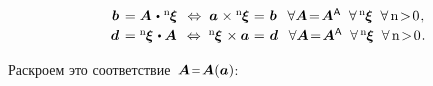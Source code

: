 \nopagebreak\vspace{-0.1em}\begin{equation}\begin{array}{c}
\hspace{1.2em} \bm{b} \hspace{.3ex}
= \bm{A} \hspace{.2ex}\dotp\hspace{.1ex} {^\mathrm{n}\hspace{-0.12ex}\bm{\xi}}
\;\,\Leftrightarrow\;
\bm{a} \hspace{.1ex} \times {^\mathrm{n}\hspace{-0.12ex}\bm{\xi}}
\hspace{.1ex} = \hspace{.15ex} \bm{b} \hspace{.1ex} \;\:\:
\forall \bm{A} \!=\! \bm{A}^{\mathsf{\!\,A}} \;\;
\forall \, {^\mathrm{n}\hspace{-0.12ex}\bm{\xi}} \;\; \forall \,\mathrm{n \!>\! 0}
\hspace{.15ex} ,
\\[.2em]
%
\hspace{1.2em} \bm{d} \hspace{.3ex}
= {^\mathrm{n}\hspace{-0.12ex}\bm{\xi}} \hspace{.2ex} \dotp \bm{A}
\;\,\Leftrightarrow\;
{^\mathrm{n}\hspace{-0.12ex}\bm{\xi}} \hspace{.2ex}\times \bm{a}
\hspace{.1ex} = \hspace{.15ex} \bm{d} \hspace{.1ex} \;\:\:
\forall \bm{A} \!=\! \bm{A}^{\mathsf{\!\,A}} \;\;
\forall \, {^\mathrm{n}\hspace{-0.12ex}\bm{\xi}} \;\; \forall \,\mathrm{n \!>\! 0}
\hspace{.15ex} .
\end{array}\end{equation}

Раскроем это соответствие~${\bm{A} \narroweq \bm{A}(\bm{a})}$:


